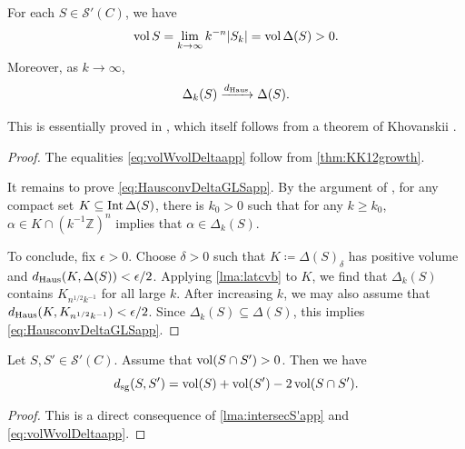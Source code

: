 \begin{theorem}\label{thm:HausOkounapp}
	For each $S\in \mathcal{S}'(C)$, we have
	\begin{equation}\label{eq:volWvolDeltaapp}
		\operatorname{vol} S=\lim_{k\to\infty} k^{-n}|S_k|=\operatorname{vol} \Delta(S)>0.
	\end{equation}
    Moreover, as $k\to\infty$,
	\begin{equation}\label{eq:HausconvDeltaGLSapp}
		\Delta_{k}(S)\xrightarrow{d_{\mathrm{Haus}}}\Delta(S).
	\end{equation}
\end{theorem}
This is essentially proved in \cite[Lemma~4.8]{WN14}, which itself follows from a theorem of Khovanskii \cite{Kho92}.
\begin{proof}
	The equalities \eqref{eq:volWvolDeltaapp} follow from \cref{thm:KK12growth}.



	It remains to prove \eqref{eq:HausconvDeltaGLSapp}. By the argument of \cite[Lemma~4.8]{WN14}, for any compact set $K\subseteq \operatorname{Int} \Delta(S)$, there is $k_0>0$ such that for any $k\geq k_0$, $\alpha\in K\cap (k^{-1}\mathbb{Z})^n$ implies that $\alpha\in \Delta_k(S)$.

	To conclude, fix $\epsilon>0$. Choose $\delta>0$ such that $K\coloneqq \Delta(S)_{\delta}$ has positive volume and $d_{\mathrm{Haus}}(K,\Delta(S))<\epsilon/2$. Applying \cref{lma:latcvb} to $K$, we find that $\Delta_k(S)$ contains $K_{n^{1/2}k^{-1}}$ for all large $k$. After increasing $k$, we may also assume that $d_{\mathrm{Haus}}(K,K_{n^{1/2}k^{-1}})<\epsilon/2$. Since $\Delta_k(S)\subseteq \Delta(S)$, this implies \eqref{eq:HausconvDeltaGLSapp}.
\end{proof}
\begin{corollary}\label{cor:distapp}
    Let $S,S'\in \mathcal{S}'(C)$. Assume that $\operatorname{vol} (S\cap S')>0$. Then we have
    \[
    d_{\mathrm{sg}}(S,S')=\operatorname{vol}(S)+\operatorname{vol}(S')-2\operatorname{vol}(S\cap S').
    \]
\end{corollary}
\begin{proof}
    This is a direct consequence of \cref{lma:intersecS'app} and \eqref{eq:volWvolDeltaapp}.
\end{proof}

